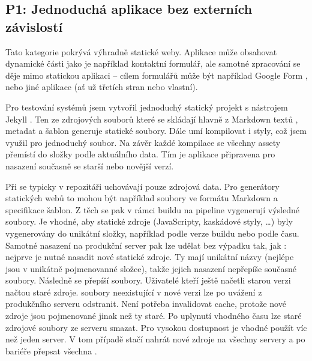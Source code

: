     \subsection{P1: Jednoduchá aplikace bez externích závislostí}
        Tato kategorie pokrývá výhradně statické weby. Aplikace může obsahovat dynamické části jako je například kontaktní formulář, ale samotné zpracování se děje mimo statickou aplikaci -- cílem formulářů může být například Google Form \cite{mccoy-google-form}, nebo jiné aplikace (ať už třetích stran nebo vlastní).

        Pro testování \CICD systémů jsem vytvořil jednoduchý statický projekt s nástrojem Jekyll \cite{jekyll}. Ten ze zdrojových souborů které se skládají hlavně z Markdown textů \cite{markdown}, metadat a šablon generuje statické \HTML soubory. Dále umí kompilovat i styly, což jsem využil pro jednoduchý  soubor. Na závěr každé kompilace se všechny assety přemístí do složky podle aktuálního data. Tím je aplikace připravena pro nasazení současně se starší nebo novější verzí.

        Při \CICD se typicky v repozitáři uchovávají pouze zdrojová data. Pro generátory statických webů to mohou být například soubory ve formátu Markdown a specifikace \HTML šablon. Z těch se pak v rámci buildu na \CICD pipeline vygenerují výsledné \HTML soubory. Je vhodné, aby statické zdroje (JavaScripty, kaskádové styly, \ldots) byly vygenerovány do unikátní složky, například podle verze buildu nebo podle času. Samotné nasazení na produkční server pak lze udělat bez výpadku tak, jak : nejprve je nutné nasadit nové statické zdroje. Ty mají unikátní názvy (nejlépe jsou v unikátně pojmenovanné složce), takže jejich nasazení nepřepíše současné soubory. Následně se přepíší \HTML soubory. Uživatelé kteří ještě načetli starou verzi načtou staré zdroje. \HTML soubory neexistující v nové verzi lze po uvážení z produkčního serveru odstranit. Není potřeba invalidovat cache, protože nové zdroje jsou pojmenované jinak než ty staré. Po uplynutí vhodného času lze staré zdrojové soubory ze serveru smazat. Pro vysokou dostupnost je vhodné použít víc než jeden server. V tom případě stačí nahrát nové zdroje na všechny servery a po bariéře přepsat všechna \HTML.

